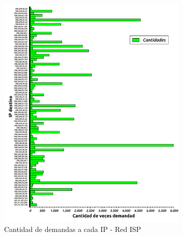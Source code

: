 \begin{figure}[H]
        \begin{subfigure}[H]{0.5\textwidth}
                \centering
                \includegraphics[width=1\textwidth]{graficos/cantidadConsultasCasaJulian.pdf}
                \caption{Cantidad de demandas a cada IP - Red ISP}
                \label{fig:hist1}
        \end{subfigure}
        \begin{subfigure}[H]{0.5\textwidth}
                \centering

\end{subfigure}
\end{figure}
